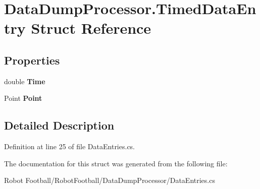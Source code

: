 \hypertarget{struct_data_dump_processor_1_1_timed_data_entry}{\section{Data\-Dump\-Processor.\-Timed\-Data\-Entry Struct Reference}
\label{struct_data_dump_processor_1_1_timed_data_entry}
}
\subsection*{Properties}
\begin{DoxyCompactItemize}
\item 
\hypertarget{struct_data_dump_processor_1_1_timed_data_entry_a625145c7d6ca806ff4ce81557e7c436c}{double {\bfseries Time}}\label{struct_data_dump_processor_1_1_timed_data_entry_a625145c7d6ca806ff4ce81557e7c436c}

\item 
\hypertarget{struct_data_dump_processor_1_1_timed_data_entry_a5be29d1401d81a026657737a69f8e908}{Point {\bfseries Point}}\label{struct_data_dump_processor_1_1_timed_data_entry_a5be29d1401d81a026657737a69f8e908}

\end{DoxyCompactItemize}


\subsection{Detailed Description}


Definition at line 25 of file Data\-Entries.\-cs.



The documentation for this struct was generated from the following file\-:\begin{DoxyCompactItemize}
\item 
Robot Football/\-Robot\-Football/\-Data\-Dump\-Processor/Data\-Entries.\-cs\end{DoxyCompactItemize}

